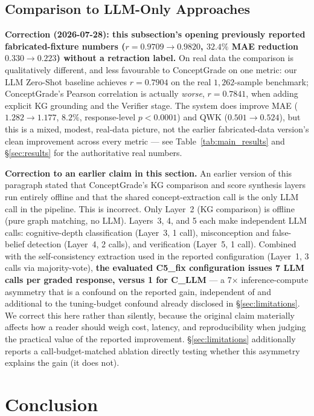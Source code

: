 \documentclass[conference]{IEEEtran}
\begin{document}
\subsection{Comparison to LLM-Only Approaches}

\textbf{Correction (2026-07-28): this subsection's opening previously
reported fabricated-fixture numbers ($r=0.9709\to0.9820$, $32.4\%$ MAE
reduction $0.330\to0.223$) without a retraction label.} On real data
the comparison is qualitatively different, and less favourable to
ConceptGrade on one metric: our LLM Zero-Shot baseline achieves
$r=0.7904$ on the real $1{,}262$-sample benchmark; ConceptGrade's
Pearson correlation is actually \emph{worse}, $r=0.7841$, when adding
explicit KG grounding and the Verifier stage. The system does improve
MAE ($1.282\to1.177$, $8.2\%$, response-level $p<0.0001$) and QWK
($0.501\to0.524$), but this is a mixed, modest, real-data picture, not
the earlier fabricated-data version's clean improvement across every
metric --- see Table~\ref{tab:main_results} and \S\ref{sec:results} for
the authoritative real numbers.

\textbf{Correction to an earlier claim in this section.} An earlier version of this
paragraph stated that ConceptGrade's KG comparison and score synthesis layers
run entirely offline and that the shared concept-extraction call is the only
LLM call in the pipeline. This is incorrect. Only Layer~2 (KG comparison) is
offline (pure graph matching, no LLM). Layers~3, 4, and 5 each make
independent LLM calls: cognitive-depth classification (Layer~3, 1 call),
misconception and false-belief detection (Layer~4, 2 calls), and verification
(Layer~5, 1 call). Combined with the self-consistency extraction used in the
reported configuration (Layer~1, 3 calls via majority-vote), \textbf{the
evaluated C5\_fix configuration issues 7 LLM calls per graded response,
versus 1 for C\_LLM} --- a 7$\times$ inference-compute asymmetry that is a
confound on the reported gain, independent of and additional to the
tuning-budget confound already disclosed in \S\ref{sec:limitations}. We
correct this here rather than silently, because the original claim
materially affects how a reader should weigh cost, latency, and
reproducibility when judging the practical value of the reported
improvement. \S\ref{sec:limitations} additionally reports a
call-budget-matched ablation directly testing whether this asymmetry
explains the gain (it does not).

\section{Conclusion}
\end{document}
